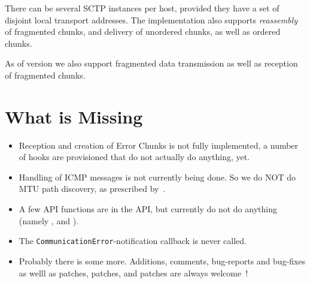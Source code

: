 \documentclass[10pt]{article}
\begin{document}
There can be several SCTP instances per host, provided they have a set of
disjoint local transport addresses.
The implementation also supports \emph{reassembly} of fragmented chunks, and
delivery of unordered chunks, as well as ordered chunks.

As of version  we also support fragmented data
transmission as well as reception of fragmented chunks.

\section{What is Missing}
\begin{itemize}
\item Reception and creation of Error Chunks is not fully implemented, a number 
of hooks are provisioned that do not actually do anything, yet.
\item Handling of ICMP messages is not currently being done. So we do NOT do MTU
path discovery, as prescribed by~\cite{RFC4960}.
\item A few API functions are in the API, but currently do not do anything
(namely  ,  and
).
\item The \texttt{CommunicationError}-notification callback is never
called.
\item Probably there is some more. Additions, comments, bug-reports and
bug-fixes as welll as patches, patches, and patches are always welcome~!
\end{itemize}

\end{document}
